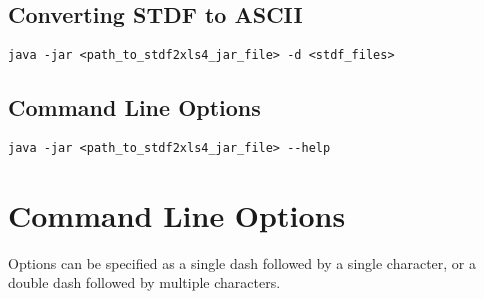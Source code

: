 \documentclass[letterpaper]{article}
\begin{document}
\subsection{Converting STDF to ASCII}
\begin{verbatim}
java -jar <path_to_stdf2xls4_jar_file> -d <stdf_files>
\end{verbatim}

\subsection{Command Line Options}
\begin{verbatim}
java -jar <path_to_stdf2xls4_jar_file> --help
\end{verbatim}

\section{Command Line Options}
Options can be specified as a single dash followed by a single character, or a double dash
followed by multiple characters.
\end{document}
